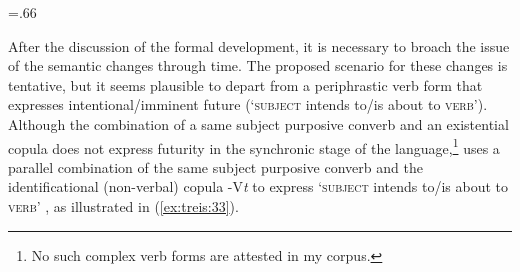 \documentclass[output=paper,colorlinks,citecolor=brown,]{langscibook}
\begin{document}
\begin{table}
\small%
\tabcolsep=.66\tabcolsep%
    \caption{The origin of the progressive}
    \label{tab:treis:7}
\end{table}

After the discussion of the formal development, it is necessary to broach the issue of the semantic changes through time. The proposed scenario for these changes is tentative, but it seems plausible to depart from a periphrastic verb form that expresses intentional\slash imminent future (`\textsc{subject} intends to\slash is about to \textsc{verb}'). Although the combination of a same subject purposive converb and an existential copula does not express futurity in the synchronic stage of the language,\footnote{No such complex verb forms are attested in my corpus.}  uses a parallel combination of the same subject purposive converb and the identificational (non-verbal) copula -V\textit{t} to express `\textsc{subject} intends to\slash is about to \textsc{verb}' \citep[139--141]{Treis2011}, as illustrated in (\ref{ex:treis:33}).
\end{document}
